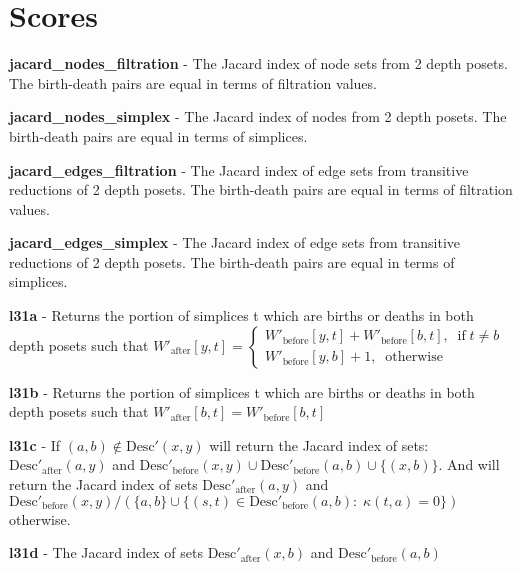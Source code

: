 \documentclass{article}
\begin{document}
\section{Scores}

\par \textbf{jacard\_nodes\_filtration} -
The Jacard index of node sets from 2 depth posets.
The birth-death pairs are equal in terms of filtration values.


\par \textbf{jacard\_nodes\_simplex} -
The Jacard index of nodes from 2 depth posets.
The birth-death pairs are equal in terms of simplices.


\par \textbf{jacard\_edges\_filtration} -
The Jacard index of edge sets from transitive reductions of 2 depth posets.
The birth-death pairs are equal in terms of filtration values.


\par \textbf{jacard\_edges\_simplex} -
The Jacard index of edge sets from transitive reductions of 2 depth posets.
The birth-death pairs are equal in terms of simplices.


\par \textbf{l31a} -
Returns the portion of simplices t which are births or deaths in both depth posets such that
$
W'_\text{after}[y, t] =
\begin{cases}
W'_\text{before}[y, t] + W'_\text{before}[b, t], \;\; \text{if}\; t\ne b \\
W'_\text{before}[y, b] + 1, \;\; \text{otherwise}
\end{cases}
$


\par \textbf{l31b} -
Returns the portion of simplices t which are births or deaths in both depth posets such that
$W'_\text{after}[b, t] = W'_\text{before}[b, t]$


\par \textbf{l31c} -
If $(a, b) \notin \text{Desc}'(x, y)$ will return the Jacard index of
sets: $\text{Desc}'_\text{after}(a, y)$ and $\text{Desc}'_\text{before}(x, y) \cup \text{Desc}'_\text{before}(a, b) \cup \{(x, b)\}$.
And will return the Jacard index of sets $\text{Desc}'_\text{after}(a, y)$ and
$\text{Desc}'_\text{before}(x, y) / (\{a, b\} \cup \{(s, t)\in \text{Desc}'_\text{before}(a, b):\; \kappa(t, a) = 0\})$
otherwise.


\par \textbf{l31d} -
The Jacard index of sets $\text{Desc}'_\text{after}(x, b)$ and $\text{Desc}'_\text{before}(a, b)$
\end{document}
